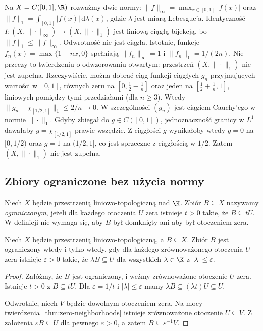 \begin{przyklad}
Na $X=C([0,1],\R)$ rozważmy dwie normy:
$\|f\|_\infty=\max_{x\in[0,1]}|f(x)|$ oraz
$\|f\|_1=\int_{[0,1]}|f(x)|\,\mathrm d\lambda(x)$,
gdzie $\lambda$ jest miarą Lebesgue'a.
Identyczność $I\colon(X,\|\cdot\|_\infty)\to(X,\|\cdot\|_1)$
jest liniową ciągłą bijekcją, bo $\|f\|_1\leq\|f\|_\infty$.
Odwrotność nie jest ciągła. Istotnie, funkcje
$f_n(x)=\max\{1-nx,0\}$ spełniają $\|f_n\|_\infty=1$
i $\|f_n\|_1=1/(2n)$.
Nie przeczy to twierdzeniu o odwzorowaniu otwartym:
przestrzeń $(X,\|\cdot\|_1)$ nie jest zupełna. Rzeczywiście,
można dobrać ciąg funkcji ciągłych $g_n$ przyjmujących wartości
w $[0,1]$, równych zeru na $[0,\tfrac12-\tfrac1n]$ oraz jeden
na $[\tfrac12+\tfrac1n,1]$, liniowych pomiędzy tymi przedziałami
(dla $n\geq3$). Wtedy
$\|g_n-\chi_{[1/2,1]}\|_1\leq2/n\to0$.
W szczególności $(g_n)$ jest ciągiem Cauchy'ego w normie
$\|\cdot\|_1$. Gdyby zbiegał do $g\in C([0,1])$,
jednoznaczność granicy w $L^1$ dawałaby
$g=\chi_{[1/2,1]}$ prawie wszędzie. Z ciągłości $g$
wynikałoby wtedy $g=0$ na $[0,1/2)$ oraz $g=1$ na
$(1/2,1]$, co jest sprzeczne z ciągłością w $1/2$.
Zatem $(X,\|\cdot\|_1)$ nie jest zupełna.
\end{przyklad}

\subsection{Zbiory ograniczone bez użycia normy}

\begin{definicja}\label{def:tvs-bounded}
Niech $X$ będzie przestrzenią liniowo-topologiczną nad $\K$.
Zbiór $B\subseteq X$ nazywamy \emph{ograniczonym}, jeżeli
dla każdego otoczenia $U$ zera istnieje $t>0$ takie,
że $B\subseteq tU$. W definicji nie wymaga się, aby $B$
był domknięty ani aby był otoczeniem zera.
\end{definicja}

\begin{lemat}\label{lem:bounded-test}
Niech $X$ będzie przestrzenią liniowo-topologiczną, a $B\subseteq X$.
Zbiór $B$ jest ograniczony wtedy i tylko wtedy, gdy dla każdego
zrównoważonego otoczenia $U$ zera istnieje $\varepsilon>0$ takie,
że $\lambda B\subseteq U$ dla wszystkich $\lambda\in\K$
z $|\lambda|\leq\varepsilon$.
\end{lemat}
\begin{proof}
Załóżmy, że $B$ jest ograniczony, i weźmy zrównoważone
otoczenie $U$ zera. Istnieje $t>0$ z $B\subseteq tU$.
Dla $\varepsilon=1/t$ i $|\lambda|\leq\varepsilon$
mamy $\lambda B\subseteq(\lambda t)U\subseteq U$.

Odwrotnie, niech $V$ będzie dowolnym otoczeniem zera.
Na mocy twierdzenia~\ref{thm:zero-neighborhoods} istnieje
zrównoważone otoczenie $U\subseteq V$. Z założenia
$\varepsilon B\subseteq U$ dla pewnego $\varepsilon>0$,
a zatem $B\subseteq\varepsilon^{-1}V$.
\end{proof}

